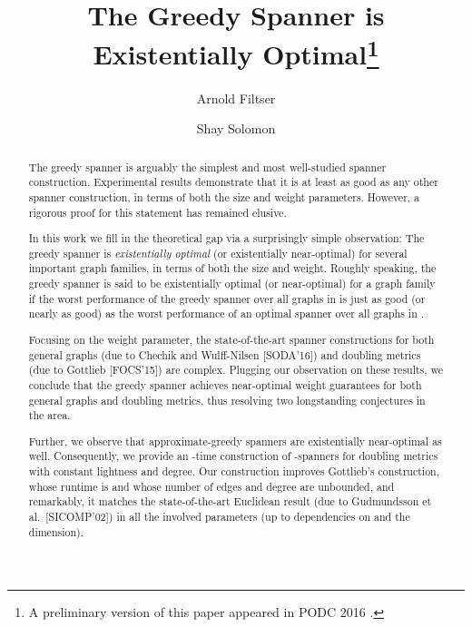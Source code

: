 \documentclass[11pt,letterpaper]{article}
\begin{document}
\author[1]{Arnold Filtser}
\author[2]{Shay Solomon}


 

  \title{The Greedy Spanner is Existentially Optimal\footnote{A preliminary version of this paper appeared in PODC 2016 \cite{FS16}.}}
  \maketitle

\begin{abstract}
The greedy spanner is arguably the simplest and most well-studied spanner construction.
Experimental results demonstrate that it is at least as good as any other spanner construction, in terms of both the size and weight parameters.
However, a rigorous proof for this statement has remained elusive.

In this work we fill in the theoretical gap via a surprisingly simple observation: The greedy spanner is \emph{existentially optimal} (or existentially near-optimal)
for several important graph families, in terms of both the size and weight.
Roughly speaking, the greedy spanner is said to be existentially optimal (or near-optimal)
for a graph family  if the worst performance of the greedy spanner over all graphs in 
is just as good (or nearly as good) as the worst performance of an optimal spanner over all graphs in .

Focusing on the weight parameter, the state-of-the-art spanner constructions for both general graphs
(due to Chechik and Wulff-Nilsen [SODA'16]) and doubling metrics (due to Gottlieb [FOCS'15]) are complex. Plugging our observation on these results, we conclude that the greedy spanner achieves near-optimal weight guarantees for both general graphs and doubling metrics, thus resolving two longstanding conjectures in the area.

Further, we observe that approximate-greedy spanners are existentially near-optimal as well.
Consequently, we provide an -time construction of -spanners for doubling metrics with constant lightness and degree.
Our construction improves Gottlieb's construction, whose runtime is  and whose number of edges and degree are unbounded,
and remarkably, it matches the state-of-the-art Euclidean result (due to  Gudmundsson et al.\ [SICOMP'02]) in all the involved parameters
(up to dependencies on  and the dimension).
\end{abstract}
\end{document}
